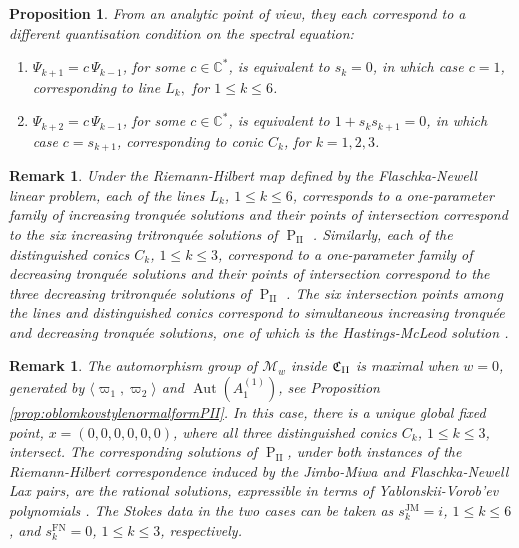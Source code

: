 \documentclass[a4paper,reqno]{amsart}
\numberwithin{equation}{section}
\newcommand{\pain}[1]{\operatorname{P}_{\mathrm{#1}}}
\DeclareMathOperator{\Aut}{Aut}
\newtheorem{proposition}[theorem]{Proposition}
\newtheorem{remark}[theorem]{Remark}
\numberwithin{equation}{section}
\begin{document}
\begin{proposition}
From an analytic point of view, they each correspond to a different quantisation condition on the spectral equation:
 \begin{enumerate}
     \item $\Psi_{k+1}=c\,\Psi_{k-1}$, for some $c\in\mathbb{C}^*$, is equivalent to $s_k=0$, in which case $c=1$, corresponding to line $L_k,$ for $1\leq k\leq 6$.
     \item $\Psi_{k+2}=c\,\Psi_{k-1}$, for some $c\in\mathbb{C}^*$, is equivalent to $1+s_ks_{k+1}=0$, in which case $c=s_{k+1}$, corresponding to conic $C_k$, for $k=1,2,3$.
 \end{enumerate}
\end{proposition}


\begin{remark}
    Under the Riemann-Hilbert map defined by the Flaschka-Newell linear problem, each of the lines $L_k$, $1\leq k\leq 6$, corresponds to a one-parameter family of increasing tronqu\'ee solutions and their points of intersection correspond to the six increasing tritronqu\'ee solutions of $\pain{II}$ \cite[Sec. 11.5]{fokas}. Similarly, each of the distinguished conics $C_k$, $1\leq k\leq 3$, correspond to a one-parameter family of decreasing tronqu\'ee solutions and their points of intersection correspond to the three decreasing tritronqu\'ee solutions  of $\pain{II}$ \cite[Sec. 11.6]{fokas}. The six intersection points among the lines and distinguished conics correspond to simultaneous increasing tronqu\'ee and decreasing tronqu\'ee solutions, one of which is the Hastings-McLeod solution \cite[Sec. 11.7]{fokas}.
\end{remark}


\begin{remark}
    The automorphism group of $\mathcal{M}_w$ inside $\mathfrak{C}_{\rm{II}}$ is maximal when $w=0$, generated by $\langle\varpi_1,\varpi_2\rangle$ and $\Aut(A_1^{(1)})$, see Proposition \ref{prop:oblomkovstylenormalformPII}.  In this case, there is a unique global fixed point, $x=(0,0,0,0,0,0)$, where all three distinguished conics $C_k$, $1\leq k\leq 3$, intersect. The corresponding solutions of $\pain{II}$, under
    both instances of the Riemann-Hilbert correspondence induced by the Jimbo-Miwa and
     Flaschka-Newell Lax pairs, are the rational solutions, expressible in terms of Yablonskii-Vorob'ev polynomials \cite{millerrational}. The Stokes data in the two cases can be taken as 
     $s_k^{\operatorname{JM}}=i$, $1\leq k\leq 6$, and
$s_k^{\operatorname{FN}}=0$, $1\leq k\leq 3$, respectively.
\end{remark}
\end{document}
